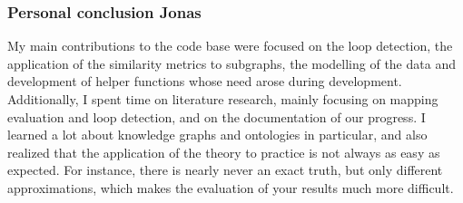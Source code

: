 \documentclass[runningheads]{llncs}
\begin{document}
\subsubsection{Personal conclusion Jonas}
My main contributions to the code base were focused on the loop detection, the application
of the similarity metrics to subgraphs, the modelling of the data and development of helper functions
whose need arose during development. Additionally, I spent time on literature research,
mainly focusing on mapping evaluation and loop detection, and on the documentation of our progress.
I learned  a lot about knowledge graphs and ontologies in particular, and also realized
that the application of the theory to practice is not always as easy as expected. For instance,
there is nearly never an exact truth, but only different approximations, which makes
the evaluation of your results much more difficult. 
\end{document}
